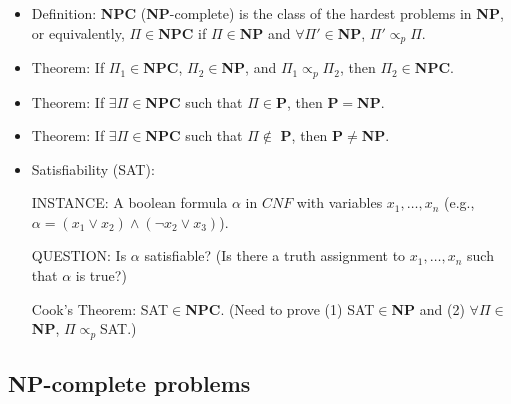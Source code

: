 \documentclass{article}
\begin{document}
\begin{itemize}

\item Definition: {\bf NPC} ({\bf NP}-complete) is the class of
the hardest problems in {\bf NP}, or equivalently, $\Pi\in${\bf NPC}
if $\Pi\in${\bf NP} and $\forall\Pi'\in${\bf NP}, $\Pi'\propto_p\Pi$.

\item Theorem: If $\Pi_1\in${\bf NPC}, $\Pi_2\in${\bf NP}, and
$\Pi_1\propto_p\Pi_2$, then $\Pi_2\in${\bf NPC}.

\item Theorem: If $\exists\Pi\in${\bf NPC} such that $\Pi\in${\bf P},
then {\bf P}$=${\bf NP}.

\item Theorem: If $\exists\Pi\in${\bf NPC} such that $\Pi\not\in$
{\bf P}, then {\bf P}$\not=${\bf NP}.
 
\item Satisfiability (SAT):

INSTANCE: A boolean formula $\alpha$ in $CNF$ with variables 
$x_1,\ldots,x_n$ (e.g., $\alpha=(x_1\lor x_2)\land(\neg x_2\lor x_3)$).

QUESTION: Is $\alpha$ satisfiable? (Is there a truth assignment to
$x_1,\ldots,x_n$ such that $\alpha$ is true?)

Cook's Theorem: SAT$\in${\bf NPC}. (Need to prove (1) SAT$\in${\bf NP}
and (2) $\forall\Pi\in${\bf NP}, $\Pi\propto_p$SAT.)

\end{itemize}

\subsection{NP-complete problems}
\end{document}
